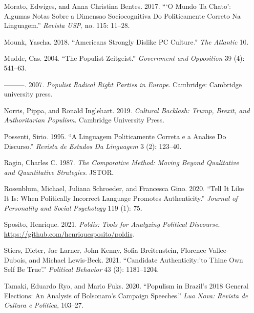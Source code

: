 \documentclass[smallextended]{svjour3}       %
\newlength{\cslhangindent}
\newlength{\cslentryspacingunit} %
\newenvironment{CSLReferences}[2] %
 {%
  \setlength{\parindent}{0pt}
  \ifodd #1
  \let\oldpar\par
  \def\par{\hangindent=\cslhangindent\oldpar}
  \fi
  \setlength{\parskip}{#2\cslentryspacingunit}
 }%
 {}
\begin{document}
\begin{CSLReferences}{1}{0}
\leavevmode{}%
Morato, Edwiges, and Anna Christina Bentes. 2017. {``{`O Mundo Ta
Chato'}: Algumas Notas Sobre a Dimensao Sociocognitiva Do Politicamente
Correto Na Linguagem.''} \emph{Revista USP}, no. 115: 11--28.

\leavevmode{}%
Mounk, Yascha. 2018. {``Americans Strongly Dislike PC Culture.''}
\emph{The Atlantic} 10.

\leavevmode{}%
Mudde, Cas. 2004. {``The Populist Zeitgeist.''} \emph{Government and
Opposition} 39 (4): 541--63.

\leavevmode{}%
---------. 2007. \emph{Populist Radical Right Parties in Europe}.
Cambridge: Cambridge university press.

\leavevmode{}%
Norris, Pippa, and Ronald Inglehart. 2019. \emph{Cultural Backlash:
Trump, Brexit, and Authoritarian Populism}. Cambridge University Press.

\leavevmode{}%
Possenti, Sirio. 1995. {``A Linguagem Politicamente Correta e a Analise
Do Discurso.''} \emph{Revista de Estudos Da Linguagem} 3 (2): 123--40.

\leavevmode{}%
Ragin, Charles C. 1987. \emph{The Comparative Method: Moving Beyond
Qualitative and Quantitative Strategies}. JSTOR.

\leavevmode{}%
Rosenblum, Michael, Juliana Schroeder, and Francesca Gino. 2020. {``Tell
It Like It Is: When Politically Incorrect Language Promotes
Authenticity.''} \emph{Journal of Personality and Social Psychology} 119
(1): 75.

\leavevmode{}%
Sposito, Henrique. 2021. \emph{Poldis: Tools for Analyzing Political
Discourse}. \url{https://github.com/henriquesposito/poldis}.

\leavevmode{}%
Stiers, Dieter, Jac Larner, John Kenny, Sofia Breitenstein, Florence
Vallee-Dubois, and Michael Lewis-Beck. 2021. {``Candidate
Authenticity:'to Thine Own Self Be True'.''} \emph{Political Behavior}
43 (3): 1181--1204.

\leavevmode{}%
Tamaki, Eduardo Ryo, and Mario Fuks. 2020. {``Populism in Brazil's 2018
General Elections: An Analysis of Bolsonaro's Campaign Speeches.''}
\emph{Lua Nova: Revista de Cultura e Politica}, 103--27.


\end{CSLReferences}
\end{document}

